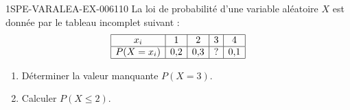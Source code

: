 \begin{exercice}{1SPE-VARALEA-EX-006}{1}{10}
La loi de probabilité d'une variable aléatoire $X$ est donnée par le tableau incomplet suivant :
\[
\begin{array}{|c|c|c|c|c|}
\hline
x_i & 1 & 2 & 3 & 4 \\
\hline
P(X=x_i) & 0{,}2 & 0{,}3 & ? & 0{,}1 \\
\hline
\end{array}
\]

\begin{enumerate}
  \item Déterminer la valeur manquante $P(X=3)$.
  \item Calculer $P(X \leq 2)$.
\end{enumerate}
\end{exercice}
